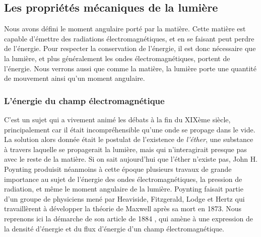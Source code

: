 \subsection{Les propriétés mécaniques de la lumière}
Nous avons défini le moment angulaire porté par la matière. Cette matière est capable d'émettre des radiations électromagnétiques, et en se faisant peut perdre de l'énergie. Pour respecter la conservation de l'énergie, il est donc nécessaire que la lumière, et plus généralement les ondes électromagnétiques, portent de l'énergie. Nous verrons aussi que comme la matière, la lumière porte une quantité de mouvement ainsi qu'un moment angulaire.

\subsubsection{L'énergie du champ électromagnétique} 
C'est un sujet qui a vivement animé les débats à la fin du XIXème siècle, principalement car il était incompréhensible qu'une onde se propage dans le vide. La solution alors donnée était le postulat de l'existence de \textit{l'éther}, une substance à travers laquelle se propagerait la lumière, mais qui n’interagirait presque pas avec le reste de la matière. Si on sait aujourd'hui que l'éther n'existe pas, John H. Poynting produisit néanmoins à cette époque plusieurs travaux de grande importance au sujet de l'énergie des ondes électromagnétiques, la pression de radiation, et même le moment angulaire de la lumière. Poynting faisait partie d'un groupe de physiciens mené par Heaviside, Fitzgerald, Lodge et Hertz qui travaillèrent à développer la théorie de Maxwell après sa mort en 1873. Nous reprenons ici la démarche de son article de 1884 , qui amène à une expression de la densité d'énergie et du flux d'énergie d'un champ électromagnétique.

